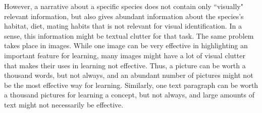 



However, a narrative about a specific species does not contain only ``visually" relevant information, but also gives abundant information about the species's habitat, diet, mating habits that is not relevant for visual identification. In a sense, this information might be textual clutter for that task. The same problem takes place in images. While one image can be very effective in highlighting an important feature for learning, many images  might have a lot of visual clutter that makes their uses in learning not effective. %
Thus, a picture can be worth a thousand words, but not always, and an abundant number of pictures might not be the most effective way for learning. Similarly, one text paragraph can be worth a thousand pictures for learning a concept, but not always, and large amounts of text might not necessarily be effective.





 

